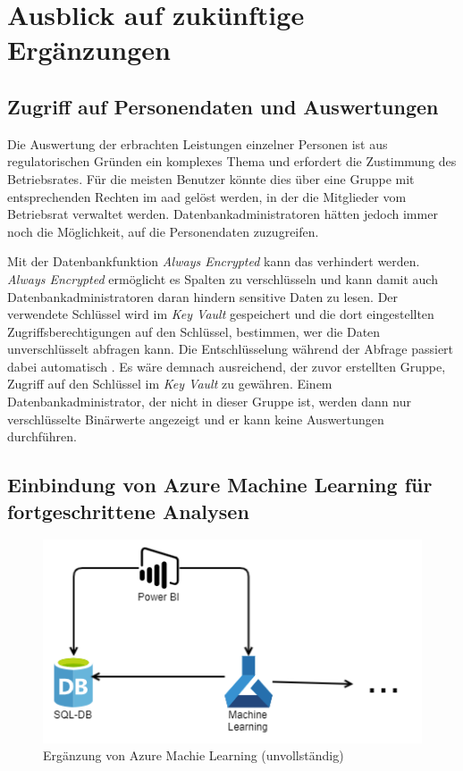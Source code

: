 \section{Ausblick auf zukünftige Ergänzungen} \label{sec:praktischeUmsetzung:ausblick}

\subsection{Zugriff auf Personendaten und Auswertungen}
Die Auswertung der erbrachten Leistungen einzelner Personen ist aus regulatorischen Gründen ein komplexes Thema und erfordert die Zustimmung des Betriebsrates. Für die meisten Benutzer könnte dies über eine Gruppe mit entsprechenden Rechten im \ac{aad} gelöst werden, in der die Mitglieder vom Betriebsrat verwaltet werden. Datenbankadministratoren hätten jedoch immer noch die Möglichkeit, auf die Personendaten zuzugreifen. 

Mit der Datenbankfunktion \textit{Always Encrypted} kann das verhindert werden. \textit{Always Encrypted} ermöglicht es Spalten zu verschlüsseln und kann damit auch Datenbankadministratoren daran hindern sensitive Daten zu lesen. Der verwendete Schlüssel wird im \textit{Key Vault} gespeichert und die dort eingestellten Zugriffsberechtigungen auf den Schlüssel, bestimmen, wer die Daten unverschlüsselt abfragen kann. Die Entschlüsselung während der Abfrage passiert dabei automatisch \cite{mauri_practical_2021}. Es wäre demnach ausreichend, der zuvor erstellten Gruppe, Zugriff auf den Schlüssel im \textit{Key Vault} zu gewähren. Einem Datenbankadministrator, der nicht in dieser Gruppe ist, werden dann nur verschlüsselte Binärwerte angezeigt und er kann keine Auswertungen durchführen.

\subsection{Einbindung von Azure Machine Learning für fortgeschrittene Analysen} \label{sec:praktischeUmsetzung:ausblick:aml}

\begin{figure}[htbp]
 \centering
 \includegraphics[width=\textwidth]{gfx/aml.png}
 \caption[Azure Machine Learning]{Ergänzung von Azure Machie Learning (unvollständig)}
\label{fig:praktischeUmsetzung:ausblick:aml}
\end{figure}